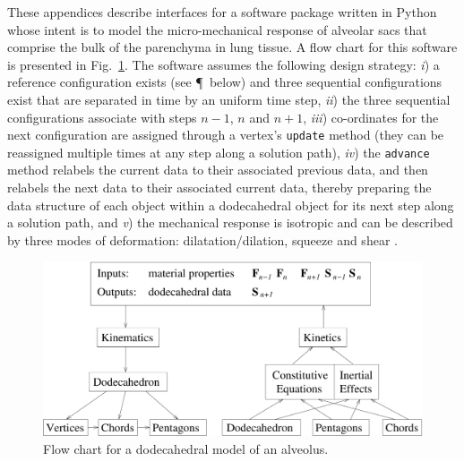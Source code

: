 
These appendices describe interfaces for a software package written in Python whose intent is to model the micro-mechanical response of alveolar sacs that comprise the bulk of the parenchyma in lung tissue.  A flow chart for this software is presented in Fig.~\ref{figFlow}.  The software assumes the following design strategy: \textit{i\/}) a reference configuration exists (see \P\ below) and three sequential configurations exist that are separated in time by an uniform time step, \textit{ii\/}) the three sequential configurations associate with steps $n \! - \! 1$, $n$ and $n \! + \! 1$, \textit{iii\/}) co-ordinates for the next configuration are assigned through a vertex's \texttt{update} method (they can be reassigned multiple times at any step along a solution path), \textit{iv\/}) the \texttt{advance} method relabels the current data to their associated previous data, and then relabels the next data to their associated current data, thereby preparing the data structure of each object within a dodecahedral object for its next step along a solution path, and \textit{v\/}) the mechanical response is isotropic and can be described by three modes of deformation: dilatation\slash dilation, squeeze and shear \cite{Freedetal17,FreedZamani19}.

\begin{figure}
	\centering
	\includegraphics[width=\columnwidth]{figures/flow.pdf}
	\caption{Flow chart for a dodecahedral model of an alveolus.}
	\label{figFlow}
\end{figure}

